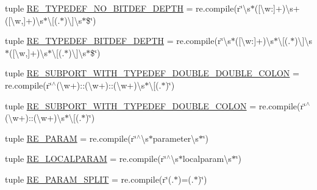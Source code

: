 \begin{DoxyCompactItemize}
\item 
tuple \hyperlink{namespacesrc_1_1regex_a9ae4103c026ef3f7811a52e17beafc5c}{R\-E\-\_\-\-T\-Y\-P\-E\-D\-E\-F\-\_\-\-N\-O\-\_\-\-B\-I\-T\-D\-E\-F\-\_\-\-D\-E\-P\-T\-H} = re.\-compile(r\char`\"{}\textbackslash{}s$\ast$(\mbox{[}\textbackslash{}w\-:\mbox{]}+)\textbackslash{}s+(\mbox{[}\textbackslash{}w,\mbox{]}+)\textbackslash{}s$\ast$\textbackslash{}\mbox{[}(.$\ast$)\textbackslash{}\mbox{]}\textbackslash{}s$\ast$\$\char`\"{})
\item 
tuple \hyperlink{namespacesrc_1_1regex_a81f0e132e012964cda4ecd13e909dc0b}{R\-E\-\_\-\-T\-Y\-P\-E\-D\-E\-F\-\_\-\-B\-I\-T\-D\-E\-F\-\_\-\-D\-E\-P\-T\-H} = re.\-compile(r\char`\"{}\textbackslash{}s$\ast$(\mbox{[}\textbackslash{}w\-:\mbox{]}+)\textbackslash{}s$\ast$\textbackslash{}\mbox{[}(.$\ast$)\textbackslash{}\mbox{]}\textbackslash{}s$\ast$(\mbox{[}\textbackslash{}w,\mbox{]}+)\textbackslash{}s$\ast$\textbackslash{}\mbox{[}(.$\ast$)\textbackslash{}\mbox{]}\textbackslash{}s$\ast$\$\char`\"{})
\item 
tuple \hyperlink{namespacesrc_1_1regex_a15857aad4b7ca1a97fb7eac4fce17336}{R\-E\-\_\-\-S\-U\-B\-P\-O\-R\-T\-\_\-\-W\-I\-T\-H\-\_\-\-T\-Y\-P\-E\-D\-E\-F\-\_\-\-D\-O\-U\-B\-L\-E\-\_\-\-D\-O\-U\-B\-L\-E\-\_\-\-C\-O\-L\-O\-N} = re.\-compile(r\char`\"{}$^\wedge$(\textbackslash{}w+)\-::(\textbackslash{}w+)\-::(\textbackslash{}w+)\textbackslash{}s$\ast$\textbackslash{}\mbox{[}(.$\ast$)\char`\"{})
\item 
tuple \hyperlink{namespacesrc_1_1regex_acfa022765950d182790d5fafcba42b62}{R\-E\-\_\-\-S\-U\-B\-P\-O\-R\-T\-\_\-\-W\-I\-T\-H\-\_\-\-T\-Y\-P\-E\-D\-E\-F\-\_\-\-D\-O\-U\-B\-L\-E\-\_\-\-C\-O\-L\-O\-N} = re.\-compile(r\char`\"{}$^\wedge$(\textbackslash{}w+)\-::(\textbackslash{}w+)\textbackslash{}s$\ast$\textbackslash{}\mbox{[}(.$\ast$)\char`\"{})
\item 
tuple \hyperlink{namespacesrc_1_1regex_ac9116c703bbb8f7840b81c535f03218c}{R\-E\-\_\-\-P\-A\-R\-A\-M} = re.\-compile(r\char`\"{}$^\wedge$\textbackslash{}s$\ast$parameter\textbackslash{}s$\ast$\char`\"{})
\item 
tuple \hyperlink{namespacesrc_1_1regex_ae43e1bd4a4c2138510ad6a466f919380}{R\-E\-\_\-\-L\-O\-C\-A\-L\-P\-A\-R\-A\-M} = re.\-compile(r\char`\"{}$^\wedge$\textbackslash{}s$\ast$localparam\textbackslash{}s$\ast$\char`\"{})
\item 
tuple \hyperlink{namespacesrc_1_1regex_a1be39b603c3992f11ede9a1591636f9d}{R\-E\-\_\-\-P\-A\-R\-A\-M\-\_\-\-S\-P\-L\-I\-T} = re.\-compile(r\char`\"{}(.$\ast$)=(.$\ast$)\char`\"{})
\item 

\end{DoxyCompactItemize}
